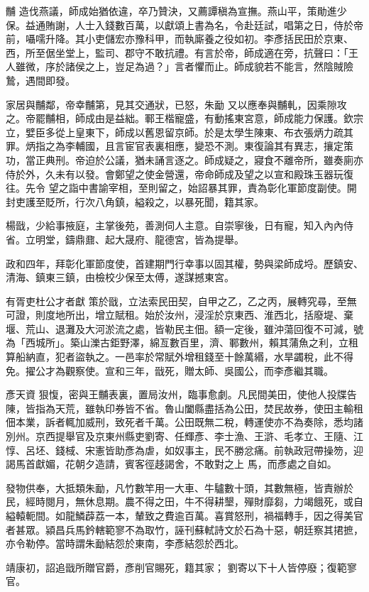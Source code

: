 \begin{pinyinscope}
 黼
 造伐燕議，師成始猶依違，卒乃贊決，又薦譚稹為宣撫。燕山平，策勛進少保。益通賄謝，人士入錢數百萬，以獻頌上書為名，令赴廷試，唱第之日，侍於帝前，囁嚅升降。其小吏儲宏亦豫科甲，而執廝養之役如初。李彥括民田於京東、西，所至倨坐堂上，監司、郡守不敢抗禮。有言於帝，師成適在旁，抗聲曰：「王人雖微，序於諸侯之上，豈足為過？」言者懼而止。師成貌若不能言，然陰賊險鷙，遇間即發。



 家居與黼鄰，帝幸黼第，見其交通狀，已怒，朱勔
 又以應奉與黼軋，因乘隙攻之。帝罷黼相，師成由是益絀。鄆王楷寵盛，有動搖東宮意，師成能力保護。欽宗立，嬖臣多從上皇東下，師成以舊恩留京師。於是太學生陳東、布衣張炳力疏其罪。炳指之為李輔國，且言宦官表裏相應，變恐不測。東復論其有異志，攘定策功，當正典刑。帝迫於公議，猶未誦言逐之。師成疑之，寢食不離帝所，雖奏廁亦侍於外，久未有以發。會鄭望之使金營還，帝命師成及望之以宣和殿珠玉器玩復往。先令
 望之詣中書諭宰相，至則留之，始詔暴其罪，責為彰化軍節度副使。開封吏護至貶所，行次八角鎮，縊殺之，以暴死聞，籍其家。



 楊戩，少給事掖庭，主掌後苑，善測伺人主意。自崇寧後，日有寵，知入內內侍省。立明堂，鑄鼎鼐、起大晟府、龍德宮，皆為提舉。



 政和四年，拜彰化軍節度使，首建期門行幸事以固其權，勢與梁師成埒。歷鎮安、清海、鎮東三鎮，由檢校少保至太傅，遂謀撼東宮。



 有胥吏杜公才者獻
 策於戩，立法索民田契，自甲之乙，乙之丙，展轉究尋，至無可證，則度地所出，增立賦租。始於汝州，浸淫於京東西、淮西北，括廢堤、棄堰、荒山、退灘及大河淤流之處，皆勒民主佃。額一定後，雖沖蕩回復不可減，號為「西城所」。築山濼古鉅野澤，綿亙數百里，濟、鄆數州，賴其蒲魚之利，立租算船納直，犯者盜執之。一邑率於常賦外增租錢至十餘萬緡，水旱蠲稅，此不得免。擢公才為觀察使。宣和三年，戩死，贈太師、吳國公，而李彥繼其職。



 彥天資
 狠愎，密與王黼表裏，置局汝州，臨事愈劇。凡民間美田，使他人投牒告陳，皆指為天荒，雖執印券皆不省。魯山闔縣盡括為公田，焚民故券，使田主輸租佃本業，訴者輒加威刑，致死者千萬。公田既無二稅，轉運使亦不為奏除，悉均諸別州。京西提舉官及京東州縣吏劉寄、任輝彥、李士漁、王滸、毛孝立、王隨、江惇、呂坯、錢棫、宋憲皆助彥為虐，如奴事主，民不勝忿痛。前執政冠帶操笏，迎謁馬首獻媚，花朝夕造請，賓客徑趍謁舍，不敢對之上
 馬，而彥處之自如。



 發物供奉，大抵類朱勔，凡竹數竿用一大車、牛驢數十頭，其數無極，皆責辦於民，經時閱月，無休息期。農不得之田，牛不得耕墾，殫財靡芻，力竭餓死，或自縊轅軛間。如龍鱗薜荔一本，輦致之費逾百萬。喜賞怒刑，禍福轉手，因之得美官者甚眾。潁昌兵馬鈐轄範寥不為取竹，誣刊蘇軾詩文於石為十惡，朝廷察其捃摭，亦令勒停。當時謂朱勔結怨於東南，李彥結怨於西北。



 靖康初，詔追戩所贈官爵，彥削官賜死，籍其家；
 劉寄以下十人皆停廢；復範寥官。



\end{pinyinscope}